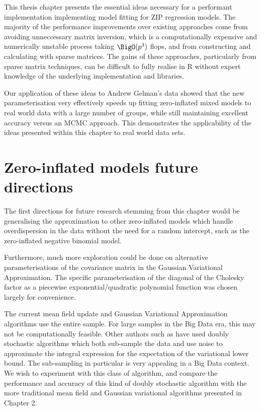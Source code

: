 This thesis chapter presents the essential ideas necessary for a performant
implementation implementing model fitting for ZIP regression models.
The majority of the performance improvements over existing approaches come from
avoiding unneccessary matrix inversion, which is a computationally expensive
and numerically unstable process taking $\BigO(p^3)$ flops, and  from
constructing and calculating with sparse matrices. The gains of these
approaches, particularly from sparse  matrix techniques, can be difficult to
fully realise in R without expert knowledge of the underlying implementation
and libraries.
		
Our application of these ideas to Andrew Gelman's data showed that the new
parameterisation very effectively speeds up fitting zero-inflated mixed models
to real world data with a large number of groups, while still maintaining
excellent accuracy versus an MCMC approach. This demonstrates the applicability
of the ideas presented within this chapter to real world data sets.
\section{Zero-inflated models future directions}
		
The first directions for future research stemming from this chapter would be
generalising the approximation to other zero-inflated models which handle
overdispersion in the data without the need for a random intercept, such as the
zero-inflated negative binomial model.

Furthermore, much more exploration could be done on alternative
parameterisations of the covariance matrix in the Gaussian Variational
Approximation. The specific parameterisation of the diagonal of the Cholesky
factor as a piecewise exponential/quadratic polynomial function was chosen
largely for convenience.

The current mean field update and Gaussian Variational Approximation algorithms
use the entire sample. For large samples in the Big Data era, this may not be
computationally feasible. Other authors such as \cite{Tan2018} have used doubly
stochastic algorithms which both sub-sample the data and use noise to
approximate the integral expression for the expectation of the variational
lower bound. The sub-sampling in particular is very appealing in a Big Data
context. We wish to experiment with this class of algorithm, and compare the
performance and accuracy of this kind of doubly stochastic algorithm with the
more traditional mean field and Gaussian variational algorithms presented in
Chapter 2.

